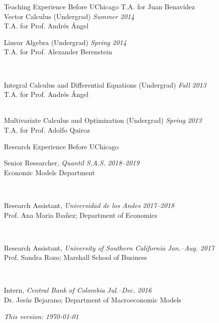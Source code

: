 \documentclass{resume} %
\begin{document}
\begin{rSection}{Teaching Experience Before UChicago}
		{\small T.A. for Juan Benavidez}\\[0.35em]
		Vector Calculus (Undergrad) \hfill {\em Summer 2014}\\[-0.25em]
		{\small T.A. for Prof. Andrés Ángel}\\[0.35em]
		\parbox{\linewidth}{Linear Algebra (Undergrad) \hfill {\em Spring 2014}\\[-0.25em]
		{\small T.A. for Prof. Alexander Berenstein}}\\[0.35em]
		\parbox{\linewidth}{Integral Calculus and Differential Equations (Undergrad) \hfill {\em Fall 2013}\\[-0.25em]
		{\small T.A. for Prof. Andrés Ángel}}\\[0.35em]
		Multivariate Calculus and Optimization (Undergrad) \hfill {\em Spring 2013}\\[-0.25em]
		{\small T.A. for Prof. Adolfo Quiroz}
	\end{rSection}

	\begin{rSection}{Research Experience Before UChicago}
		\parbox{\linewidth}{Senior Researcher, \textit{Quantil S.A.S.} \hfill {\em 2018--2019}\\[-0.25em]
		{\small Economic Models Department}}\\[0.35em]

		\parbox{\linewidth}{Research Assistant, \textit{Universidad de los Andes} \hfill {\em 2017--2018}\\[-0.25em]
		{\small Prof. Ana Maria Ibañez; Department of Economics}}\\[0.35em]

		\parbox{\linewidth}{Research Assistant, \textit{University of Southern California} \hfill {\em Jan.--Aug. 2017}\\[-0.25em]
		{\small Prof. Sandra Rozo; Marshall School of Business}}\\[0.35em]

		\parbox{\linewidth}{Intern, \textit{Central Bank of Colombia} \hfill {\em Jul.--Dec. 2016}\\[-0.25em]
		{\small Dr. Jesús Bejarano; Department of Macroeconomic Models}}
	\end{rSection}

	\vfill
	\flushright \textit{This version: \today}
\end{document}
